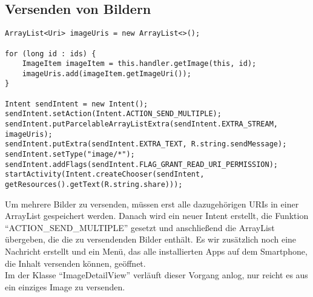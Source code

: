 \subsection{Versenden von Bildern}

\begin{lstlisting}
ArrayList<Uri> imageUris = new ArrayList<>();

for (long id : ids) {
    ImageItem imageItem = this.handler.getImage(this, id);
    imageUris.add(imageItem.getImageUri());
}

Intent sendIntent = new Intent();
sendIntent.setAction(Intent.ACTION_SEND_MULTIPLE);
sendIntent.putParcelableArrayListExtra(sendIntent.EXTRA_STREAM, imageUris);
sendIntent.putExtra(sendIntent.EXTRA_TEXT, R.string.sendMessage);
sendIntent.setType("image/*");
sendIntent.addFlags(sendIntent.FLAG_GRANT_READ_URI_PERMISSION);
startActivity(Intent.createChooser(sendIntent, getResources().getText(R.string.share)));
\end{lstlisting}
Um mehrere Bilder zu versenden, müssen erst alle dazugehörigen URIs in einer ArrayList gespeichert werden. Danach wird ein neuer Intent erstellt, die Funktion \enquote{ACTION\_SEND\_MULTIPLE} gesetzt und anschließend die ArrayList übergeben, die die zu versendenden Bilder enthält. Es wir zusätzlich noch eine Nachricht erstellt und ein Menü, das alle installierten Apps auf dem Smartphone, die Inhalt versenden können, geöffnet.\\
Im der Klasse \enquote{ImageDetailView} verläuft dieser Vorgang anlog, nur reicht es aus  ein einziges Image zu versenden. 

